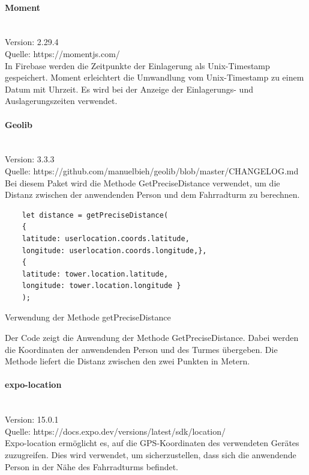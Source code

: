 \bigskip

\paragraph{Moment}\mbox{}\\
Version: 2.29.4\\
Quelle: https://momentjs.com/\\
In Firebase werden die Zeitpunkte der Einlagerung als \Gls{Unix-Timestamp} gespeichert. Moment erleichtert die Umwandlung vom \Gls{Unix-Timestamp} zu einem Datum mit Uhrzeit. Es wird bei der Anzeige der Einlagerungs- und Auslagerungszeiten verwendet.

\bigskip

\paragraph{Geolib}\mbox{}\\
Version: 3.3.3\\
Quelle: https://github.com/manuelbieh/geolib/blob/master/CHANGELOG.md\\
Bei diesem Paket wird die Methode GetPreciseDistance verwendet, um die Distanz zwischen der anwendenden Person und dem Fahrradturm zu berechnen.
\begin{listing}[H]
  \begin{verbatim}
    let distance = getPreciseDistance(
    {
    latitude: userlocation.coords.latitude,
    longitude: userlocation.coords.longitude,},
    { 
    latitude: tower.location.latitude, 
    longitude: tower.location.longitude }
    );
\end{verbatim}
  \caption{Verwendung der Methode getPreciseDistance}
  \label{lst:getprecisedistance}
\end{listing}
\noindent Der Code zeigt die Anwendung der Methode GetPreciseDistance. Dabei werden die Koordinaten der anwendenden Person und des Turmes übergeben. Die Methode liefert die Distanz zwischen den zwei Punkten in Metern.

\bigskip

\paragraph{expo-location}\mbox{}\\
Version: 15.0.1\\
Quelle: https://docs.expo.dev/versions/latest/sdk/location/\\
Expo-location ermöglicht es, auf die GPS-Koordinaten des verwendeten Gerätes zuzugreifen. Dies wird verwendet, um sicherzustellen, dass sich die anwendende Person in der Nähe des Fahrradturms befindet.

